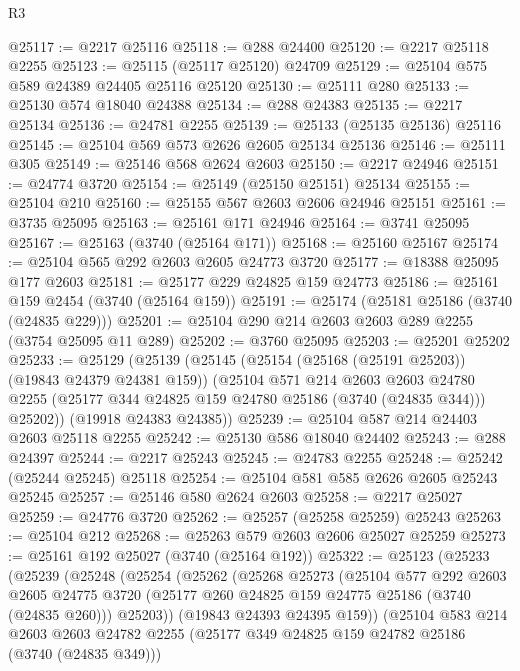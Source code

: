 \begin{lexlean}{R3}
\begin{coremodule}
@25117 := @2217 @25116
@25118 := @288 @24400
@25120 := @2217 @25118 @2255
@25123 := @25115 (@25117 @25120) @24709
@25129 := @25104 @575 @589 @24389 @24405 @25116 @25120
@25130 := @25111 @280
@25133 := @25130 @574 @18040 @24388
@25134 := @288 @24383
@25135 := @2217 @25134
@25136 := @24781 @2255
@25139 := @25133 (@25135 @25136) @25116
@25145 := @25104 @569 @573 @2626 @2605 @25134 @25136
@25146 := @25111 @305
@25149 := @25146 @568 @2624 @2603
@25150 := @2217 @24946
@25151 := @24774 @3720
@25154 := @25149 (@25150 @25151) @25134
@25155 := @25104 @210
@25160 := @25155 @567 @2603 @2606 @24946 @25151
@25161 := @3735 @25095
@25163 := @25161 @171 @24946
@25164 := @3741 @25095
@25167 := @25163 (@3740 (@25164 @171))
@25168 := @25160 @25167
@25174 := @25104 @565 @292 @2603 @2605 @24773 @3720
@25177 := @18388 @25095 @177 @2603
@25181 := @25177 @229 @24825 @159 @24773
@25186 := @25161 @159 @2454 (@3740 (@25164 @159))
@25191 := @25174 (@25181 @25186 (@3740 (@24835 @229)))
@25201 := @25104 @290 @214 @2603 @2603 @289 @2255 (@3754 @25095 @11 @289)
@25202 := @3760 @25095
@25203 := @25201 @25202
@25233 := @25129
    (@25139
      (@25145
        (@25154 (@25168 (@25191 @25203)) (@19843 @24379 @24381 @159))
        (@25104
          @571
          @214
          @2603
          @2603
          @24780
          @2255
          (@25177 @344 @24825 @159 @24780 @25186 (@3740 (@24835 @344)))
          @25202))
      (@19918 @24383 @24385))
@25239 := @25104 @587 @214 @24403 @2603 @25118 @2255
@25242 := @25130 @586 @18040 @24402
@25243 := @288 @24397
@25244 := @2217 @25243
@25245 := @24783 @2255
@25248 := @25242 (@25244 @25245) @25118
@25254 := @25104 @581 @585 @2626 @2605 @25243 @25245
@25257 := @25146 @580 @2624 @2603
@25258 := @2217 @25027
@25259 := @24776 @3720
@25262 := @25257 (@25258 @25259) @25243
@25263 := @25104 @212
@25268 := @25263 @579 @2603 @2606 @25027 @25259
@25273 := @25161 @192 @25027 (@3740 (@25164 @192))
@25322 := @25123
    (@25233
      (@25239
        (@25248
          (@25254
            (@25262
              (@25268
                @25273
                (@25104
                  @577
                  @292
                  @2603
                  @2605
                  @24775
                  @3720
                  (@25177 @260 @24825 @159 @24775 @25186 (@3740 (@24835 @260)))
                  @25203))
              (@19843 @24393 @24395 @159))
            (@25104
              @583
              @214
              @2603
              @2603
              @24782
              @2255
              (@25177 @349 @24825 @159 @24782 @25186 (@3740 (@24835 @349)))

\end{coremodule}
\end{lexlean}
